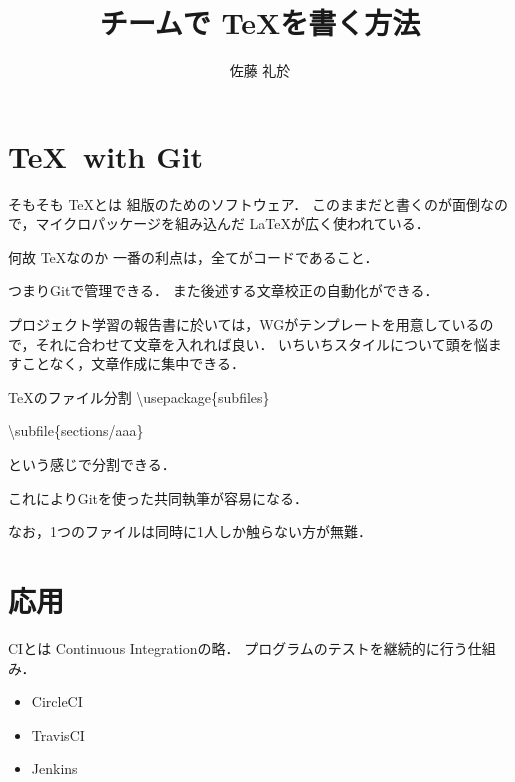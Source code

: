 \documentclass{beamer}
\title{チームで \TeX を書く方法}
\author{佐藤 礼於}
\begin{document}
\maketitle

\section{\TeX \ with Git}

\begin{frame}{そもそも \TeX とは}
  組版のためのソフトウェア．
  このままだと書くのが面倒なので，マイクロパッケージを組み込んだ \LaTeX が広く使われている．
\end{frame}

\begin{frame}{何故 \TeX なのか}
  一番の利点は，全てがコードであること．

  つまりGitで管理できる．
  また後述する文章校正の自動化ができる．

  プロジェクト学習の報告書に於いては，WGがテンプレートを用意しているので，それに合わせて文章を入れれば良い．
  いちいちスタイルについて頭を悩ますことなく，文章作成に集中できる．
\end{frame}

\begin{frame}{\TeX のファイル分割}
  \textbackslash usepackage\{subfiles\}

  \textbackslash subfile\{sections/aaa\}

  という感じで分割できる．

  これによりGitを使った共同執筆が容易になる．

  なお，1つのファイルは同時に1人しか触らない方が無難．
\end{frame}


\section{応用}

\begin{frame}{CIとは}
  Continuous Integrationの略．
  プログラムのテストを継続的に行う仕組み．

  \begin{itemize}
    \item CircleCI
    \item TravisCI
    \item Jenkins
  \end{itemize}
\end{frame}
\end{document}
